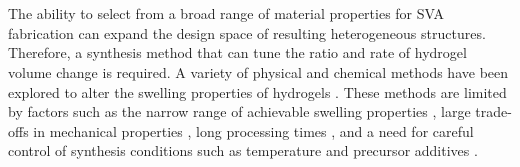 \section{}
The ability to select from a broad range of material properties for SVA fabrication can expand the design space of resulting heterogeneous structures. Therefore, a synthesis method that can tune the ratio and rate of hydrogel volume change is required. 
A variety of physical and chemical methods have been explored to alter the swelling properties of hydrogels \cite{Zhang2008,Imran2010}. 
These methods are limited by factors such as the narrow range of achievable swelling properties \cite{Kim2016a,Gan2001}, large trade-offs in mechanical properties \cite{Li2018,Depa2012}, long processing times \cite{Zhou2018b, Ma2014}, and a need for careful control of synthesis conditions such as temperature \cite{Otsuka2012} and precursor additives \cite{Bodenberger2016}.\\ 

